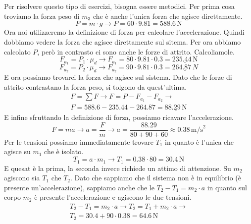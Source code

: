 Per risolvere questo tipo di esercizi, bisogna essere metodici. Per prima cosa troviamo la forza
peso di $m_3$ che è anche l'unica forza che agisce direttamente.
\begin{equation*}
  P = m\cdot g \rightarrow P = 60\cdot9.81 = \underline{588.6\,\text{N}}
\end{equation*}
Ora noi utilizzeremo la definizione di forza per calcolare l'accelerazione. Quindi dobbiamo vedere
la forza che agisce direttamente sul sitema. Per ora abbiamo calcolato $P$, però in contrasto
ci sono anche le forze di attrito. Calcoliamole.
\begin{equation*}
  F_{a_1} = P_1\cdot\mu_d \rightarrow F_{a_1} = 80\cdot9.81\cdot0.3 = \underline{235.44\,\text{N}}
\end{equation*}
\begin{equation*}
  F_{a_2} = P_2\cdot\mu_d \rightarrow F_{a_2} = 90\cdot9.81\cdot0.3 = \underline{264.87\,N}
\end{equation*}
E ora possiamo trovarci la forza che agisce sul sistema. Dato che le forze di attrito contrastano
la forza peso, si tolgono da quest'ultima.
\begin{align*}
  F = \sum F \rightarrow F = P - F_{a_1} - F_{a_2} \rightarrow\\
  F = 588.6 - 235.44 - 264.87 = \underline{88.29\,\text{N}}
\end{align*}
E infine sfruttando la definizione di forza, possiamo ricavare l'accelerazione.
\begin{equation*}
  F = ma \rightarrow a = \frac{F}{m} \rightarrow a = \frac{88.29}{80+90+60} 
  \approx\boxed{0.38\,\text{m/s}^2}
\end{equation*}
Per le tensioni possiamo immediatamente trovare $T_1$ in quanto è l'unica che agisce su $m_1$ che è
isolato.
\begin{equation*}
  T_1 = a\cdot m_1 \rightarrow T_1 = 0.38\cdot80 = \boxed{30.4\,\text{N}}
\end{equation*}
E quesat è la prima, la seconda invece richiede un attimo di attenzione. Su $m_2$ agiscono sia $T_1$ 
che $T_2$. Dato che sappiamo che il sistema non è in equilibrio (è presente un'accelerazione),
sappiamo anche che le $T_2-T_1 = m_2\cdot a$ in quanto sul corpo $m_2$ è presente l'accelerazione e
agiscono le due tensioni.
\begin{align*}
  T_2-T_1 = m_2\cdot a \rightarrow T_2 = T_1 + m_2\cdot a \rightarrow\\
  T_2 = 30.4 + 90\cdot0.38 = \boxed{64.6\,\text{N}}
\end{align*}

